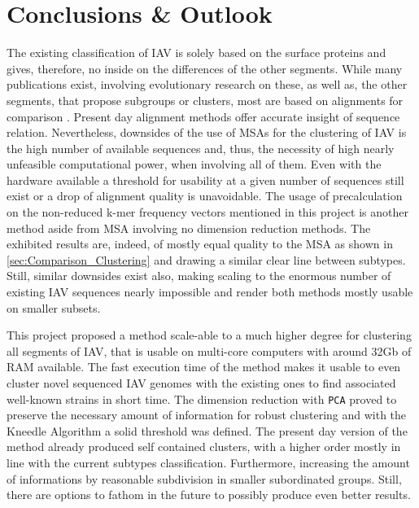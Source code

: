 \chapter{Conclusions \& Outlook} \label{chap:Conclusion}

The existing classification of \gls{IAV} is solely based on the surface proteins and gives, therefore, no inside on the differences of the other segments. While many publications exist, involving evolutionary research on these, as well as, the other segments, that propose subgroups or clusters, most are based on alignments for comparison \autocite{suarez_evolution_2000, nelson_multiple_2008, whooiefao_h5n1_evolution_working_group_continued_2012}. Present day alignment methods offer accurate insight of sequence relation. Nevertheless, downsides of the use of \glspl{MSA} for the clustering of \gls{IAV} is the high number of available sequences and, thus, the necessity of high nearly unfeasible computational power, when involving all of them. Even with the hardware available a threshold for usability at a given number of sequences still exist or a drop of alignment quality is unavoidable. The usage of precalculation on the non-reduced k-mer frequency vectors mentioned in this project is another method aside from \gls{MSA} involving no dimension reduction methods. The exhibited results are, indeed, of mostly equal quality to the \gls{MSA} as shown in \autoref{sec:Comparison_Clustering} and drawing a similar clear line between subtypes. Still, similar downsides exist also, making scaling to the enormous number of existing \gls{IAV} sequences nearly impossible and render both methods mostly usable on smaller subsets.

\vspace{1em}

This project proposed a method scale-able to a much higher degree for clustering all segments of \gls{IAV}, that is usable on multi-core computers with around 32Gb of RAM available. The fast execution time of the method makes it usable to even cluster novel sequenced \gls{IAV} genomes with the existing ones to find associated well-known strains in short time. The dimension reduction with \texttt{PCA} proved to preserve the necessary amount of information for robust clustering and with the Kneedle Algorithm a solid threshold was defined. The present day version of the method already produced self contained clusters, with a higher order mostly in line with the current subtypes classification. Furthermore, increasing the amount of informations by reasonable subdivision in smaller subordinated groups. Still, there are options to fathom in the future to possibly produce even better results. 

